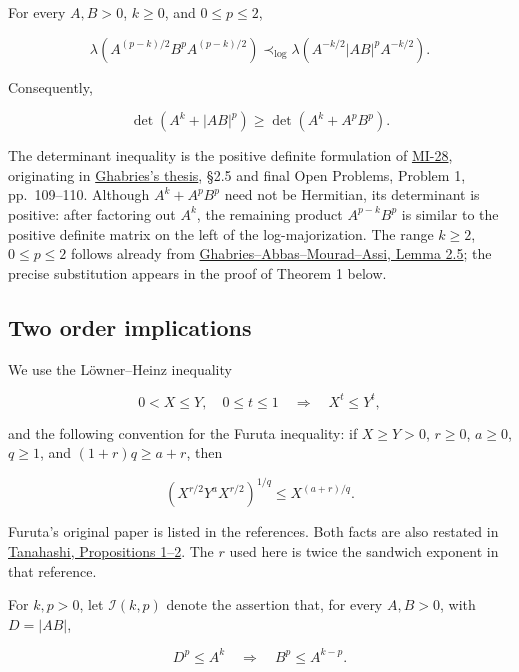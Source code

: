 \documentclass[10pt,a4paper]{article}
\begin{document}
For every \(A,B>0\), \(k\ge0\), and \(0\le p\le2\),

\[
\lambda\!\left(A^{(p-k)/2}B^pA^{(p-k)/2}\right)
\prec_{\log}
\lambda\!\left(A^{-k/2}|AB|^pA^{-k/2}\right).
\]

Consequently,

\[
\det(A^k+|AB|^p)\ge\det(A^k+A^pB^p).
\]

The determinant inequality is the positive definite formulation of
\href{https://github.com/ajt60gaibb/OpenProblemsInNLA/blob/main/matrix-inequalities-and-norms/MI-28/README.md}{MI-28},
originating in
\href{https://www.researchgate.net/publication/361793582_Contributions_to_Matrix_Inequalities_and_Some_Applications}{Ghabries's
thesis}, §2.5 and final Open Problems, Problem 1, pp.~109--110. Although
\(A^k+A^pB^p\) need not be Hermitian, its determinant is positive: after
factoring out \(A^k\), the remaining product \(A^{p-k}B^p\) is similar
to the positive definite matrix on the left of the log-majorization. The
range \(k\ge2\), \(0\le p\le2\) follows already from
\href{https://www.researchgate.net/publication/342908148_A_proof_of_a_conjectured_determinantal_inequality}{Ghabries--Abbas--Mourad--Assi,
Lemma 2.5}; the precise substitution appears in the proof of Theorem 1
below.

\subsection{Two order implications}\label{two-order-implications}

We use the Löwner--Heinz inequality

\[
0<X\le Y,\quad 0\le t\le1
\quad\Longrightarrow\quad X^t\le Y^t,
\]

and the following convention for the Furuta inequality: if \(X\ge Y>0\),
\(r\ge0\), \(a\ge0\), \(q\ge1\), and \((1+r)q\ge a+r\), then

\[
(X^{r/2}Y^aX^{r/2})^{1/q}\le X^{(a+r)/q}.
\]

Furuta's original paper is listed in the references. Both facts are also
restated in
\href{https://www.researchgate.net/publication/255605812_The_Furuta_inequality_with_negative_powers}{Tanahashi,
Propositions 1--2}. The \(r\) used here is twice the sandwich exponent
in that reference.

For \(k,p>0\), let \(\mathcal I(k,p)\) denote the assertion that, for
every \(A,B>0\), with \(D=|AB|\),

\[
D^p\le A^k\quad\Longrightarrow\quad B^p\le A^{k-p}.
\]
\end{document}
